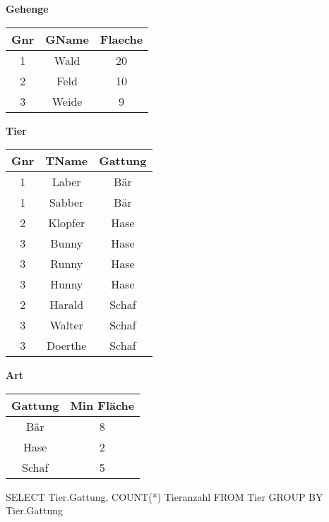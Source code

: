 \begin{table}[H]
    \scriptsize
    \centering
    \begin{minipage}[t]{0.3\textwidth}
        \centering
        \textbf{Gehenge} \\[3pt]
        \begin{tabular}{|c|c|c|}
            \hline
            \textbf{Gnr} & \textbf{GName} & \textbf{Flaeche} \\
            \hline
            1 & Wald & 20 \\
            \hline
            2 & Feld & 10 \\
            \hline
            3 & Weide & 9 \\
            \hline
        \end{tabular}
    \end{minipage}
    \hspace{0.2cm}
    \begin{minipage}[t]{0.3\textwidth}
        \centering
        \textbf{Tier} \\[3pt]
        \begin{tabular}{|c|c|c|}
            \hline
            \textbf{Gnr} & \textbf{TName} & \textbf{Gattung} \\
            \hline
            1 & Laber & Bär \\
            \hline
            1 & Sabber & Bär \\
            \hline
            2 & Klopfer & Hase \\
            \hline
            3 & Bunny & Hase \\
            \hline
            3 & Runny & Hase \\
            \hline
            3 & Hunny & Hase \\
            \hline
            2 & Harald & Schaf \\
            \hline
            3 & Walter & Schaf \\
            \hline
            3 & Doerthe & Schaf \\
            \hline
        \end{tabular}
    \end{minipage}
    \hspace{0.2cm}
    \begin{minipage}[t]{0.3\textwidth}
        \centering
        \textbf{Art} \\[3pt]
        \begin{tabular}{|c|c|}
            \hline
            \textbf{Gattung} & \textbf{Min Fläche} \\
            \hline
            Bär & 8 \\
            \hline
            Hase & 2 \\
            \hline
            Schaf & 5 \\
            \hline
        \end{tabular}
    \end{minipage}
    \end{table}

    \begin{sql}
        SELECT  Tier.Gattung, COUNT(*) Tieranzahl
            FROM Tier
            GROUP BY Tier.Gattung
    \end{sql}
